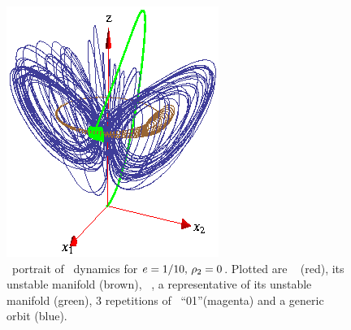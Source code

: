 \begin{figure}[ht]
\begin{center}
  \includegraphics[height=0.25\textheight]{../figs/CLE}
\end{center}
\caption[Complex Lorenz flow phase space]
{ \Statesp\ portrait of \CLe\ dynamics for $e=1/10,\, \rho_2=0$. Plotted are \reqv\
 (red), its unstable manifold (brown), \eqv\ , a
representative of its unstable manifold (green), 3 repetitions
of \rpo\ ``01''(magenta) and a generic orbit (blue).}
\label{fig:CLE}
\end{figure}


